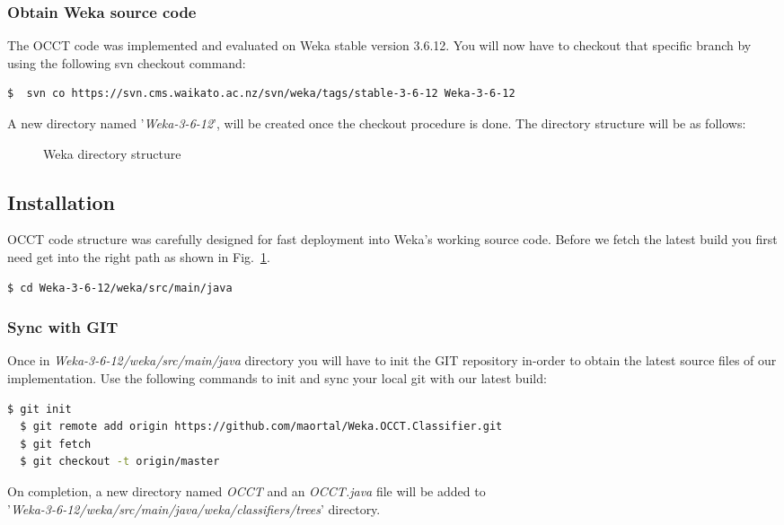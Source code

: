 \documentclass[a4paper,12pt]{article}
\newcommand{\newpar}{\smallskip\noindent} %
\begin{document}
\begin{spacing}{1.5}
\subsubsection{Obtain Weka source code}
The OCCT code was implemented and evaluated on Weka stable version 3.6.12.
You will now have to checkout that specific branch by using the following svn checkout command:
\begin{lstlisting}[language=bash,frame=none,backgroundcolor=\color{anti-flashwhite}]
  $  svn co https://svn.cms.waikato.ac.nz/svn/weka/tags/stable-3-6-12 Weka-3-6-12
\end{lstlisting}
\newpar
A new directory named '{\em Weka-3-6-12}', will be created once the checkout procedure is done.
The directory structure will be as follows:
\begin{figure}[!h]
    \caption{Weka directory structure}
    \label{fig:wekadir}
\end{figure}

\subsection{Installation}
OCCT code structure was carefully designed for fast deployment into Weka's working source code.
Before we fetch the latest build you first need get into the right path as shown in Fig.~\ref{fig:wekadir}.
\begin{lstlisting}[language=bash,frame=none,backgroundcolor=\color{anti-flashwhite}]
  $ cd Weka-3-6-12/weka/src/main/java
\end{lstlisting}

\subsubsection{Sync with GIT}
Once in {\em Weka-3-6-12/weka/src/main/java} directory you will have to init the GIT repository in-order to obtain the latest source files of our implementation.
Use the following commands to init and sync your local git with our latest build:
\begin{lstlisting}[language=bash,frame=none,backgroundcolor=\color{anti-flashwhite}]
  $ git init
  $ git remote add origin https://github.com/maortal/Weka.OCCT.Classifier.git
  $ git fetch
  $ git checkout -t origin/master
\end{lstlisting}
\newpar
On completion, a new directory named {\em OCCT} and an {\em OCCT.java} file will be added to\\
'{\em Weka-3-6-12/weka/src/main/java/weka/classifiers/trees}' directory.


\end{spacing}
\end{document}
